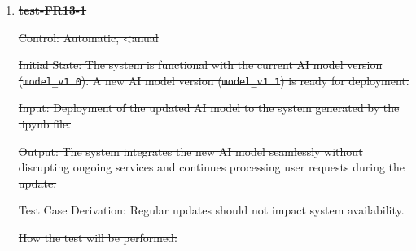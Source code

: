 \documentclass[12pt, titlepage]{article}
\begin{document}
\begin{enumerate}

\item \textbf{\sout{test-FR13-1}} \label{test-FR13-1}

\sout{Control: Automatic, <anual}

\sout{Initial State: The system is functional with the current AI model version (\texttt{model\_v1.0}). A new AI model version (\texttt{model\_v1.1}) is ready for deployment.}

\sout{Input: Deployment of the updated AI model to the system generated by the .ipynb file.}

\sout{Output: The system integrates the new AI model seamlessly without disrupting ongoing services and continues processing user requests during the update.}

\sout{Test Case Derivation: Regular updates should not impact system availability.}

\sout{How the test will be performed:}


\end{enumerate}
\end{document}

